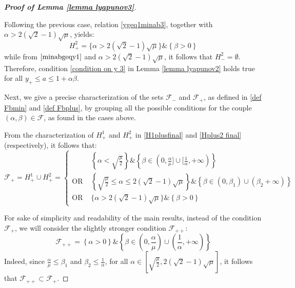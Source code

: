 \documentclass[reqno]{amsart}
\theoremstyle{plain}
\theoremstyle{definition}
\theoremstyle{remark}
\newcommand{\Fb}{\mathcal{F}}
\begin{document}
\begin{proof}[\textbf{Proof of Lemma \ref{lemma lyapunov3}}]
\begin{itemize}[wide=0pt]
		Following the previous case, relation  \eqref{ygeq1minab3}, together with $\alpha> 2(\sqrt{2}-1)\sqrt{\mu}$, yields:
		\begin{equation}\label{Hplus2 final}
			H_{+}^{2} = \{\alpha > 2(\sqrt{2}-1)\sqrt{\mu}\}\&\left\{\beta>0\right\} 
		\end{equation}
		while from $\eqref{minabgeqy1}$ and $\alpha> 2(\sqrt{2}-1)\sqrt{\mu}$, it follows that $H_{-}^{2}=\emptyset$.
		Therefore, condition \eqref{condition on y 3} in Lemma \ref{lemma lyapunov2} holds true for all $y_{+}\leq a\leq 1+\alpha\beta$.
	\end{itemize}
    
	Next, we give a precise characterization of the sets $\Fb_{-}$ and $\Fb_{+}$, as defined in \eqref{def Fbmin} and \eqref{def Fbplus}, by grouping all the possible conditions for the couple $(\alpha,\beta)\in \Fb$, as found in the cases above.
	
	
	From the characterization of $H_{+}^{1}$ and $H_{+}^{2}$ in \eqref{H1plusfinal} and \eqref{Hplus2 final} (respectively), it follows that:
	\begin{equation}
		\Fb_{+}=H_{+}^{1}\cup H_{+}^{2} = 
		\begin{cases}
			& \left\{  \alpha <\sqrt{\frac{\mu}{2}}\right\} \& \left\{\beta\in (0, \frac{\alpha}{\mu}\big]\cup \big[\frac{1}{\alpha},+\infty) \right\} \\
			\text{OR } & \left\{\sqrt{\frac{\mu}{2}}\leq \alpha \leq  2(\sqrt{2}-1)\sqrt{\mu}\right\}\&\left\{\beta\in(0,\beta_{1})\cup(\beta_{2}+\infty)\right\}  \\
			\text{OR } & \{\alpha > 2(\sqrt{2}-1)\sqrt{\mu}\}\&\left\{\beta>0\right\} 
		\end{cases}
	\end{equation}
	
For sake of simplicity and readability of the main results, instead of the condition $\Fb_{+}$, we will consider the slightly stronger condition $\Fb_{++}$:
\begin{equation}\label{final Fb++}
		\Fb_{++} = \left\{\alpha>0\right\}\&\left\{\beta\in \left(0, \frac{\alpha}{\mu}\right)\cup \left(\frac{1}{\alpha},+\infty\right) \right\}
\end{equation} 
Indeed, since $\frac{\alpha}{\mu} \leq \beta_{1}$ and $\beta_{2}\leq \frac{1}{\alpha}$, for all  $\alpha\in\left[\sqrt{\frac{\mu}{2}},2(\sqrt{2}-1)\sqrt{\mu}\right]$, it follows that $\Fb_{++} \subset \Fb_{+}$.


\end{proof}
\end{document}
